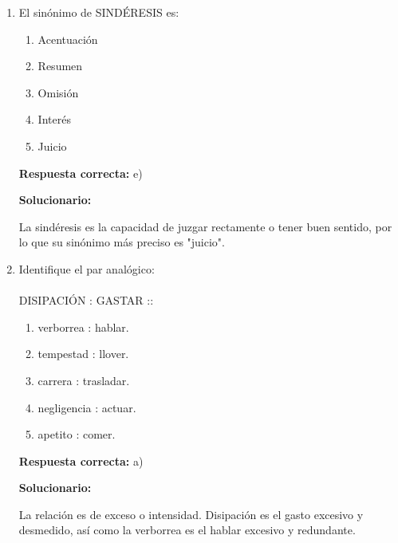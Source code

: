\begin{enumerate}[resume]
	\vspace{2mm}
	\textbf{Solucionario:}

	La palabra "impulso" se ajusta a la naturaleza interna de la vocación, mientras que "quehacer" se refiere a la actividad o tarea a la que uno se dedica.

	\vspace{6mm}

	\item El sinónimo de SINDÉRESIS es:
	\begin{enumerate}[label=\alph*)]
		\item Acentuación
		\item Resumen
		\item Omisión
		\item Interés
		\item Juicio
	\end{enumerate}
	\textbf{Respuesta correcta:} e)

	\vspace{2mm}
	\textbf{Solucionario:}

	La sindéresis es la capacidad de juzgar rectamente o tener buen sentido, por lo que su sinónimo más preciso es "juicio".

	\vspace{6mm}

	\item Identifique el par analógico:\\
	\\
	DISIPACIÓN : GASTAR ::
	\begin{enumerate}[label=\alph*)]
		\item verborrea : hablar.
		\item tempestad : llover.
		\item carrera : trasladar.
		\item negligencia : actuar.
		\item apetito : comer.
	\end{enumerate}
	\textbf{Respuesta correcta:} a)

	\vspace{2mm}
	\textbf{Solucionario:}

	La relación es de exceso o intensidad. Disipación es el gasto excesivo y desmedido, así como la verborrea es el hablar excesivo y redundante.

	\vspace{6mm}


\end{enumerate}
